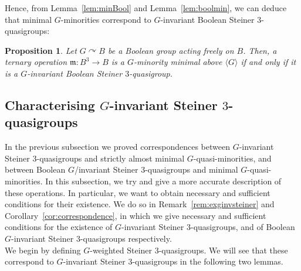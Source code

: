 \documentclass{article}
\newtheorem{prop}[theorem]{Proposition}
\theoremstyle{remark}
\theoremstyle{definition}
\def\acts{\curvearrowright}
\begin{document}
Hence, from Lemma~\ref{lem:minBool} and Lemma~\ref{lem:boolmin}, we can deduce that minimal $G$-minorities correspond to $G$-invariant Boolean Steiner $3$-quasigroups:

\begin{prop}\label{prop:bts3g} Let $G\acts B$ be a Boolean group acting freely on $B$. Then, a ternary operation $\mathfrak{m}:B^3\to B$ is a $G$-minority minimal above $\langle G \rangle$ if and only if it is a $G$-invariant Boolean Steiner $3$-quasigroup.
\end{prop}

\subsection{Characterising \texorpdfstring{$G$}{G}-invariant Steiner \texorpdfstring{$3$}{3}-quasigroups} \label{sub:chartwist}
In the previous subsection we proved correspondences between $G$-invariant Steiner $3$-quasigroups and strictly almost minimal $G$-quasi-minorities, and between Boolean $G$\-/invariant Steiner $3$-quasigroups and minimal $G$-quasi-minorities. In this subsection, we try and give a more accurate description of these operations. In particular, we want to obtain necessary and sufficient conditions for their existence. We do so in Remark~\ref{rem:exginvsteiner} and Corollary~\ref{cor:correspondence}, in which we give necessary and sufficient conditions for the existence of $G$-invariant Steiner $3$-quasigroups, and of Boolean $G$-invariant Steiner $3$-quasigroups respectively.\\

We begin by defining $G$-weighted Steiner $3$-quasigroups. We will see that these correspond to $G$-invariant Steiner $3$-quasigroups in the following two lemmas.
\end{document}
